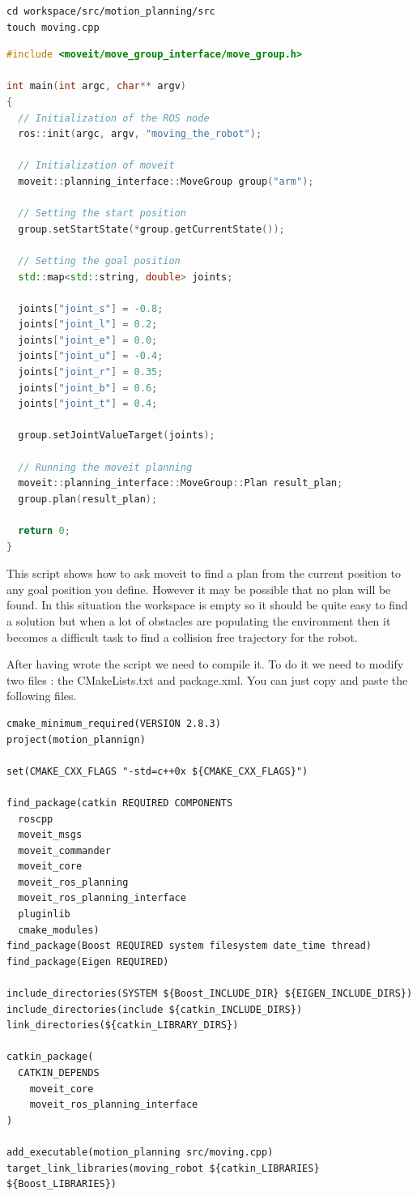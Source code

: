 \begin{lstlisting}
cd workspace/src/motion_planning/src
touch moving.cpp
\end{lstlisting}

\begin{lstlisting}[language=c++]
#include <moveit/move_group_interface/move_group.h>

int main(int argc, char** argv)
{
  // Initialization of the ROS node
  ros::init(argc, argv, "moving_the_robot");

  // Initialization of moveit 
  moveit::planning_interface::MoveGroup group("arm");

  // Setting the start position
  group.setStartState(*group.getCurrentState());

  // Setting the goal position
  std::map<std::string, double> joints;
      
  joints["joint_s"] = -0.8;
  joints["joint_l"] = 0.2;
  joints["joint_e"] = 0.0;
  joints["joint_u"] = -0.4;
  joints["joint_r"] = 0.35;
  joints["joint_b"] = 0.6;
  joints["joint_t"] = 0.4;
      
  group.setJointValueTarget(joints);

  // Running the moveit planning
  moveit::planning_interface::MoveGroup::Plan result_plan;
  group.plan(result_plan);
  
  return 0;
}
\end{lstlisting}


This script shows how to ask moveit to find a plan from the current position to any goal position you define. However it may be possible that no plan will be found. In this situation the workspace is empty so it should be quite easy to find a solution but when a lot of obstacles are populating the environment then it becomes a difficult task to find a collision free trajectory for the robot.

After having wrote the script we need to compile it. To do it we need to modify two files : the CMakeLists.txt and package.xml. You can just copy and paste the following files.


\begin{lstlisting}
cmake_minimum_required(VERSION 2.8.3)
project(motion_plannign)

set(CMAKE_CXX_FLAGS "-std=c++0x ${CMAKE_CXX_FLAGS}")

find_package(catkin REQUIRED COMPONENTS
  roscpp
  moveit_msgs
  moveit_commander
  moveit_core
  moveit_ros_planning
  moveit_ros_planning_interface
  pluginlib
  cmake_modules)
find_package(Boost REQUIRED system filesystem date_time thread)
find_package(Eigen REQUIRED)

include_directories(SYSTEM ${Boost_INCLUDE_DIR} ${EIGEN_INCLUDE_DIRS})
include_directories(include ${catkin_INCLUDE_DIRS})
link_directories(${catkin_LIBRARY_DIRS})

catkin_package(
  CATKIN_DEPENDS
    moveit_core
    moveit_ros_planning_interface
)

add_executable(motion_planning src/moving.cpp)
target_link_libraries(moving_robot ${catkin_LIBRARIES} ${Boost_LIBRARIES})
\end{lstlisting}



